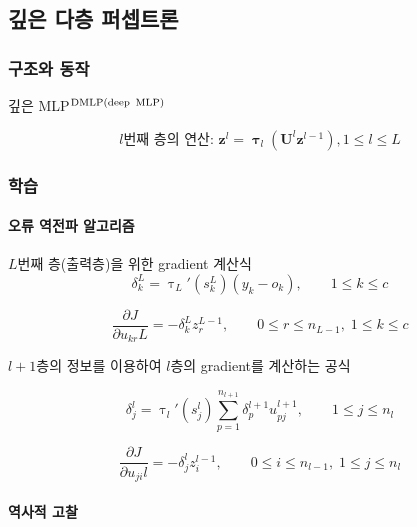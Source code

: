 \documentclass [12pt] {oblivoir}
\let\oldsubsubsection=\subsubsection
\renewcommand{\subsubsection}
{
  \filbreak
  \oldsubsubsection
}
\begin{document}
\subsection{깊은 다층 퍼셉트론}

\subsubsection{구조와 동작}

깊은 MLP$^{\text{DMLP(deep\, MLP)}}$

\begin{equation} \tag{4.5}
  l\text{번째 층의 연산: } \mathbf{z}^{l} = \boldsymbol{\uptau}_{l}(\mathbf{U}^{l}\mathbf{z}^{l-1}), 1 \le l \le L
\end{equation}

\subsubsection{학습}

\paragraph*{오류 역전파 알고리즘}\mbox{}
$L$번째 층(출력층)을 위한 gradient 계산식
\begin{equation} \tag{4.6}
  \delta_{k}^{L} = \uptau_{L}'(s_{k}^{L})(y_{k} - o_{k}), \qquad 1 \le k \le c
\end{equation}

\begin{equation} \tag{4.7}
  \frac{\partial J}{\partial u_{kr}{L}} = -\delta_{k}^{L}z_{r}^{L-1}, \qquad 0 \le r \le n_{L-1}, \; 1\le k \le c
\end{equation}

$l + 1$층의 정보를 이용하여 $l$층의 gradient를 계산하는 공식

\begin{equation} \tag{4.8}
  \delta_{j}^{l} = \uptau_{l}'(s_{j}^{l})\sum_{p=1}^{n_{l+1}}\delta_{p}^{l+1}u_{pj}^{l+1}, \qquad 1 \le j \le n_{l}
\end{equation}

\begin{equation} \tag{4.9}
  \frac{\partial J}{\partial u_{ji}{l}} = -\delta_{j}^{l}z_{i}^{l-1}, \qquad 0 \le i \le n_{l-1}, \; 1\le j \le n_{l}
\end{equation}
\vspace{3mm}

\paragraph*{역사적 고찰}\mbox{}
\end{document}
